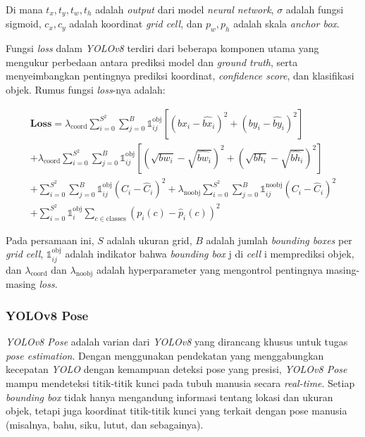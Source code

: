 Di mana \(t_x, t_y, t_w, t_h\) adalah \emph{output} dari model \emph{neural network}, \(\sigma\) adalah fungsi sigmoid, \(c_x, c_y\) adalah koordinat \emph{grid cell}, dan \(p_w, p_h\) adalah skala \emph{anchor box}.

Fungsi \emph{loss} dalam \emph{YOLOv8} terdiri dari beberapa komponen utama yang mengukur perbedaan antara prediksi model dan \emph{ground truth}, serta menyeimbangkan pentingnya prediksi koordinat, \emph{confidence score}, dan klasifikasi objek. Rumus fungsi \emph{loss}-nya adalah:

\begin{equation}
  \begin{array}{c}
  \mathbf{Loss} = \lambda_{\mathrm{coord}} \sum_{i=0}^{S^2} \sum_{j=0}^{B} \mathbb{1}_{ij}^{\mathrm{obj}} \left[ (bx_i - \hat{bx}_i)^2 + (by_i - \hat{by}_i)^2 \right] \\[10pt]
  + \lambda_{\mathrm{coord}} \sum_{i=0}^{S^2} \sum_{j=0}^{B} \mathbb{1}_{ij}^{\mathrm{obj}} \left[ (\sqrt{bw_i} - \sqrt{\hat{bw}_i})^2 + (\sqrt{bh_i} - \sqrt{\hat{bh}_i})^2 \right] \\[10pt]
  + \sum_{i=0}^{S^2} \sum_{j=0}^{B} \mathbb{1}_{ij}^{\mathrm{obj}} (C_i - \hat{C}_i)^2 + \lambda_{\mathrm{noobj}} \sum_{i=0}^{S^2} \sum_{j=0}^{B} \mathbb{1}_{ij}^{\mathrm{noobj}} (C_i - \hat{C}_i)^2 \\[10pt]
  + \sum_{i=0}^{S^2} \mathbb{1}_{i}^{\mathrm{obj}} \sum_{c \in \mathrm{classes}} (p_i(c) - \hat{p}_i(c))^2
  \end{array}
\end{equation}

Pada persamaan ini, \(S\) adalah ukuran grid, \(B\) adalah jumlah \emph{bounding boxes} per \emph{grid cell}, \(\mathbb{1}_{ij}^{\mathrm{obj}}\) adalah indikator bahwa \emph{bounding box} j di \emph{cell} i memprediksi objek, dan \(\lambda_{\mathrm{coord}}\) dan \(\lambda_{\mathrm{noobj}}\) adalah hyperparameter yang mengontrol pentingnya masing-masing \emph{loss}.
\newpage

\subsubsection{YOLOv8 Pose}
\label{subsubsec: YOLOv8 Pose}

\emph{YOLOv8 Pose} adalah varian dari \emph{YOLOv8} yang dirancang khusus untuk tugas \emph{pose estimation}. Dengan menggunakan pendekatan yang menggabungkan kecepatan \emph{YOLO} dengan kemampuan deteksi pose yang presisi, \emph{YOLOv8 Pose} mampu mendeteksi titik-titik kunci pada tubuh manusia secara \emph{real-time}. Setiap \emph{bounding box} tidak hanya mengandung informasi tentang lokasi dan ukuran objek, tetapi juga koordinat titik-titik kunci yang terkait dengan pose manusia (misalnya, bahu, siku, lutut, dan sebagainya).

